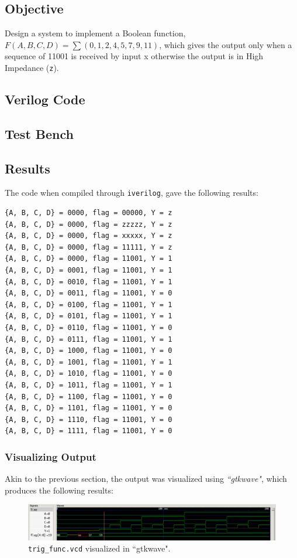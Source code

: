 \documentclass[12pt]{article}
\begin{document}
\subsection{Objective}
Design a system to implement a Boolean function, $ F(A, B, C, D) = \sum{(0, 1,
2, 4, 5, 7, 9, 11)} $, which gives the output only when a sequence of 11001 is
received by input x otherwise the output is in High Impedance (\texttt{z}).

\subsection{Verilog Code}


\subsection{Test Bench}


\subsection{Results}

The code when compiled through \texttt{iverilog}, gave the following results:

\begin{verbatim}
{A, B, C, D} = 0000, flag = 00000, Y = z
{A, B, C, D} = 0000, flag = zzzzz, Y = z
{A, B, C, D} = 0000, flag = xxxxx, Y = z
{A, B, C, D} = 0000, flag = 11111, Y = z
{A, B, C, D} = 0000, flag = 11001, Y = 1
{A, B, C, D} = 0001, flag = 11001, Y = 1
{A, B, C, D} = 0010, flag = 11001, Y = 1
{A, B, C, D} = 0011, flag = 11001, Y = 0
{A, B, C, D} = 0100, flag = 11001, Y = 1
{A, B, C, D} = 0101, flag = 11001, Y = 1
{A, B, C, D} = 0110, flag = 11001, Y = 0
{A, B, C, D} = 0111, flag = 11001, Y = 1
{A, B, C, D} = 1000, flag = 11001, Y = 0
{A, B, C, D} = 1001, flag = 11001, Y = 1
{A, B, C, D} = 1010, flag = 11001, Y = 0
{A, B, C, D} = 1011, flag = 11001, Y = 1
{A, B, C, D} = 1100, flag = 11001, Y = 0
{A, B, C, D} = 1101, flag = 11001, Y = 0
{A, B, C, D} = 1110, flag = 11001, Y = 0
{A, B, C, D} = 1111, flag = 11001, Y = 0
\end{verbatim}

\subsubsection{Visualizing Output}
Akin to the previous section, the output was visualized using
\textit{``gtkwave"}, which produces the following results:

\begin{figure}[H]
  \centering
  \includegraphics[width=\columnwidth]{img/trig_func.png}
  \caption{\texttt{trig\_func.vcd} visualized in ``gtkwave".}
\end{figure}
\end{document}
